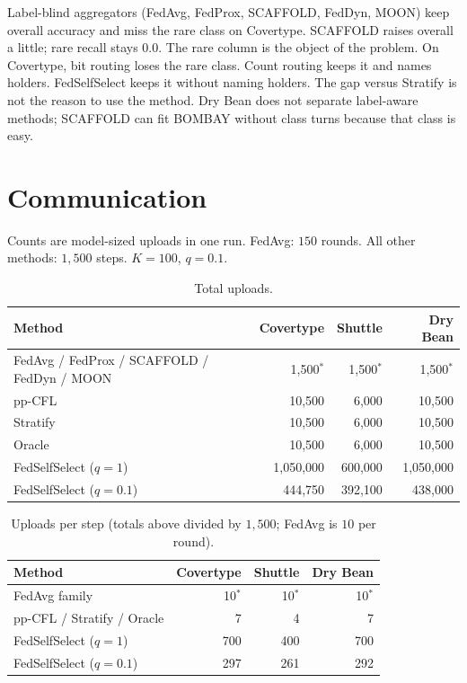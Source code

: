 \documentclass[11pt,a4paper]{article}
\theoremstyle{plain}
\begin{document}
Label-blind aggregators (FedAvg, FedProx, SCAFFOLD, FedDyn, MOON) keep overall accuracy and miss the rare class on Covertype. SCAFFOLD raises overall a little; rare recall stays 0.0. The rare column is the object of the problem. On Covertype, bit routing loses the rare class. Count routing keeps it and names holders. FedSelfSelect keeps it without naming holders. The gap versus Stratify is not the reason to use the method. Dry Bean does not separate label-aware methods; SCAFFOLD can fit BOMBAY without class turns because that class is easy.

\section{Communication}

Counts are model-sized uploads in one run. FedAvg: $150$ rounds. All other methods: $1{,}500$ steps. $K{=}100$, $q{=}0.1$.

\begin{table}[h]
\centering
\caption{Total uploads.}
\begin{tabular}{Lrrr}
\toprule
Method & Covertype & Shuttle & Dry Bean \\
\midrule
FedAvg / FedProx / SCAFFOLD / FedDyn / MOON & 1{,}500$^*$ & 1{,}500$^*$ & 1{,}500$^*$ \\
pp-CFL & 10{,}500 & 6{,}000 & 10{,}500 \\
Stratify & 10{,}500 & 6{,}000 & 10{,}500 \\
Oracle & 10{,}500 & 6{,}000 & 10{,}500 \\
FedSelfSelect ($q{=}1$) & 1{,}050{,}000 & 600{,}000 & 1{,}050{,}000 \\
FedSelfSelect ($q{=}0.1$) & 444{,}750 & 392{,}100 & 438{,}000 \\
\bottomrule
\end{tabular}
\end{table}

\begin{table}[h]
\centering
\caption{Uploads per step (totals above divided by $1{,}500$; FedAvg is $10$ per round).}
\begin{tabular}{Lrrr}
\toprule
Method & Covertype & Shuttle & Dry Bean \\
\midrule
FedAvg family & 10$^*$ & 10$^*$ & 10$^*$ \\
pp-CFL / Stratify / Oracle & 7 & 4 & 7 \\
FedSelfSelect ($q{=}1$) & 700 & 400 & 700 \\
FedSelfSelect ($q{=}0.1$) & 297 & 261 & 292 \\
\bottomrule
\end{tabular}
\end{table}
\end{document}
